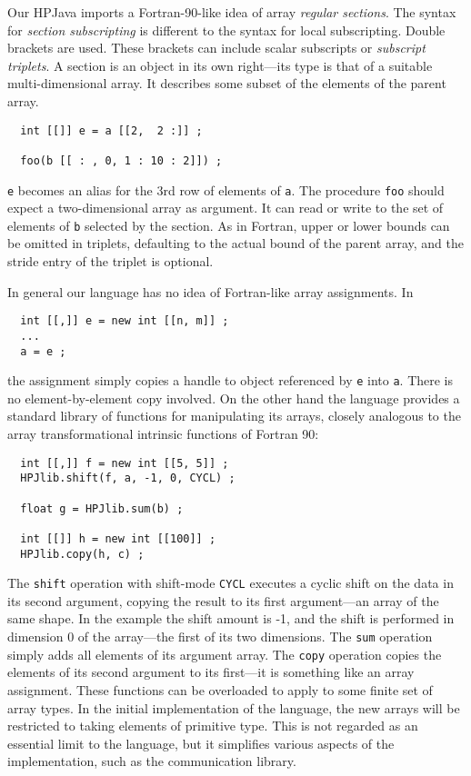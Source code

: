 Our HPJava imports a Fortran-90-like idea of array {\em regular
sections}.  The syntax for {\em section subscripting} is different to
the syntax for local subscripting.  Double brackets are used.  These
brackets can include scalar subscripts or {\em subscript triplets}.
A section is an object in its own right---its type is that of a suitable
multi-dimensional array.  It describes some subset of the elements of
the parent array.
\small
\begin{verbatim}
  int [[]] e = a [[2,  2 :]] ;

  foo(b [[ : , 0, 1 : 10 : 2]]) ;
\end{verbatim}
\normalsize
{\tt e} becomes an alias for the 3rd row of elements of {\tt a}.
The procedure {\tt foo} should expect a two-dimensional array as argument.
It can read or write to the set of elements of {\tt b} selected
by the section.
As in Fortran, upper or lower bounds can be omitted in triplets,
defaulting to the actual bound of the parent array, and the
stride entry of the triplet is optional.

In general our language has no idea of Fortran-like array assignments.  In
\small
\begin{verbatim}
  int [[,]] e = new int [[n, m]] ;
  ...
  a = e ;
\end{verbatim}
\normalsize
the assignment simply copies a handle to object referenced by {\tt e}
into {\tt a}.  There is no element-by-element copy involved. 
On the other hand
the language provides a standard library of functions for manipulating its
arrays, closely analogous to the array transformational intrinsic
functions of Fortran 90:
\small
\begin{verbatim}
  int [[,]] f = new int [[5, 5]] ;
  HPJlib.shift(f, a, -1, 0, CYCL) ;

  float g = HPJlib.sum(b) ;

  int [[]] h = new int [[100]] ;
  HPJlib.copy(h, c) ;
\end{verbatim}
\normalsize
The {\tt shift} operation with shift-mode {\tt CYCL} executes a cyclic
shift on the data in its second argument, copying the result to its
first argument---an array of the same shape.  In the example
the shift amount is -1, and the shift is performed in dimension 0 of
the array---the first of its two dimensions.  The {\tt sum} operation
simply adds all elements of its argument array.  The {\tt copy} operation
copies the elements of its second argument to its first---it is something
like an array assignment.  These functions can be overloaded
to apply to some finite set of array types.  In the initial implementation
of the language, the new arrays will be restricted to taking
elements of primitive type.  This is not regarded as an essential limit
to the language, but it simplifies various aspects of the implementation,
such as the communication library.


